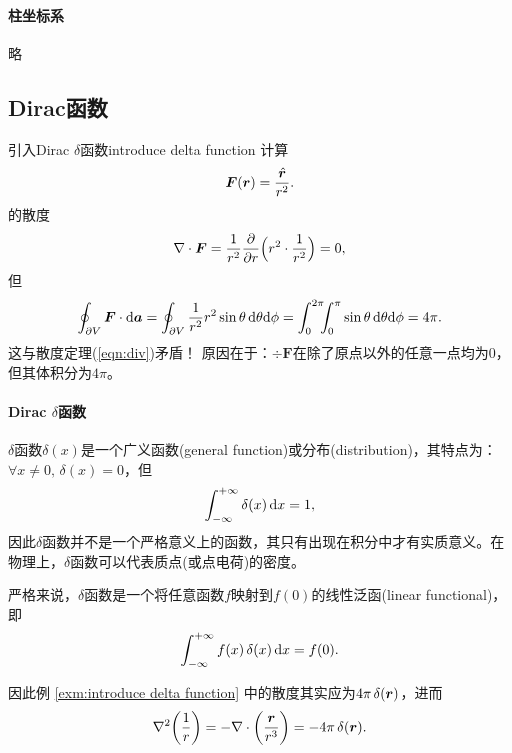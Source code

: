 \paragraph{柱坐标系}略
\subsection{Dirac函数}
\begin{example}{引入Dirac $\delta$函数}{introduce delta function}
    计算
    \[
        \bm F(\bm r)=\frac{\uvec r}{r^2}.
    \]
    的散度
    \[
        \div\bm F=\frac1{r^2}\pp r\Bigkh{r^2\cdot\frac1{r^2}}=0,
    \]
    但
    \[
        \oint_{\p V}\bm F\cdot\d\bm a=\oint_{\p V}\frac1{r^2}r^2\sin\theta\d\theta\nd\phi=\int_0^{2\pi}\bs5\int_0^\pi\sin\theta\d\theta\nd\phi=4\pi.
    \]
    这与散度定理(\ref{eqn:div})矛盾！
    原因在于：$\div\bm F$在除了原点以外的任意一点均为0，但其体积分为$4\pi$。
\end{example}
\paragraph{Dirac $\delta$函数}
$\delta$函数$\delta(x)$是一个广义函数(general function)或分布(distribution)，其特点为：$\forall x\neq 0,\,\delta(x)=0$，但
\[
    \int\iti\delta(x)\d x=1,
\]
因此$\delta$函数并不是一个严格意义上的函数，其只有出现在积分中才有实质意义。在物理上，$\delta$函数可以代表质点(或点电荷)的密度。

严格来说，$\delta$函数是一个将任意函数$f$映射到$f(0)$的线性泛函(linear functional)，即
\[
    \int\iti f(x)\vd(x)\d x=f(0).
\]

因此例 \ref{exm:introduce delta function} 中的散度其实应为$4\pi\vd(\bm r)$，进而
\begin{equation}
    \lapla\biggkh{\frac1r}=-\div\biggkh{\frac{\bm r}{r^3}}=-4\pi\vd(\bm r).
\end{equation}

